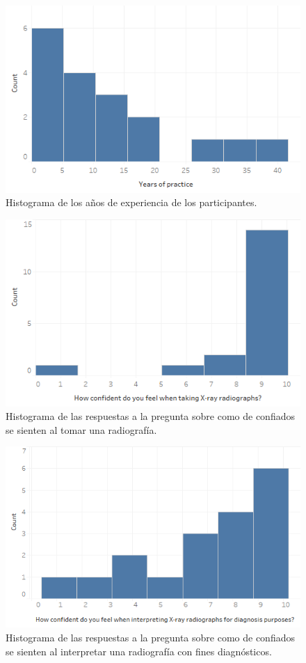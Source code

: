 \begin{figure}[ht]
        \centering
        \includegraphics[width=0.75\linewidth]{IMG/years.png}
        {
         \caption{\label{fig:year}Histograma de los años de experiencia de los participantes.}
        }
       
    \end{figure}
     \begin{figure}[ht]
        \centering
        \includegraphics[width=0.75\linewidth]{IMG/confident.png}{
        
        \caption{\label{fig:confident}Histograma de las respuestas a la pregunta sobre como de confiados se sienten al tomar una radiografía.}
        }
    \end{figure}
   
     \begin{figure}[ht]
        \centering
        \includegraphics[width=0.75\linewidth]{IMG/interpreting.png}{
        \caption{\label{fig:interpreting}Histograma de las respuestas a la pregunta sobre como de confiados se sienten al interpretar una radiografía con fines diagnósticos.}
        }
    \end{figure}


